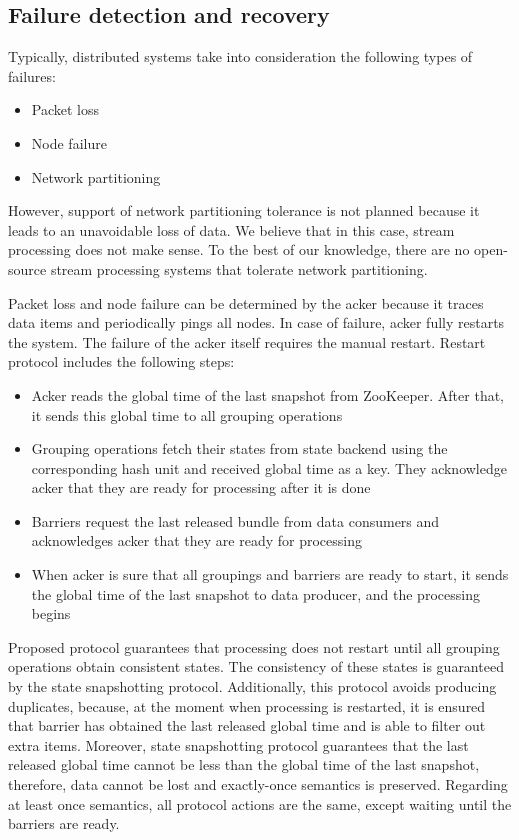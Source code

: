 \subsection{Failure detection and recovery}
Typically, distributed systems take into consideration the following types of failures:
\begin{itemize}
    \item Packet loss
    \item Node failure
    \item Network partitioning
\end{itemize}

However, support of network partitioning tolerance is not planned because it leads to an unavoidable loss of data. We believe that in this case, stream processing does not make sense. To the best of our knowledge, there are no open-source stream processing systems that tolerate network partitioning.

Packet loss and node failure can be determined by the acker because it traces data items and periodically pings all nodes. In case of failure, acker fully restarts the system. The failure of the acker itself requires the manual restart. Restart protocol includes the following steps:

\begin{itemize}
    \item Acker reads the global time of the last snapshot from ZooKeeper. After that, it sends this global time to all grouping operations
    \item Grouping operations fetch their states from state backend using the corresponding hash unit and received global time as a key. They acknowledge acker that they are ready for processing after it is done 
    \item Barriers request the last released bundle from data consumers and acknowledges acker that they are ready for processing
    \item When acker is sure that all groupings and barriers are ready to start, it sends the global time of the last snapshot to data producer, and the processing begins 
\end{itemize}

Proposed protocol guarantees that processing does not restart until all grouping operations obtain consistent states. The consistency of these states is guaranteed by the state snapshotting protocol. Additionally, this protocol avoids producing duplicates, because, at the moment when processing is restarted, it is ensured that barrier has obtained the last released global time and is able to filter out extra items. Moreover, state snapshotting protocol guarantees that the last released global time cannot be less than the global time of the last snapshot, therefore, data cannot be lost and exactly-once semantics is preserved. Regarding at least once semantics, all protocol actions are the same, except waiting until the barriers are ready.